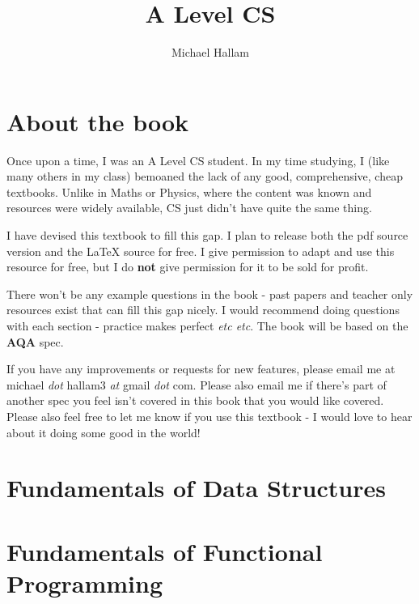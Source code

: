 \documentclass{article}
\title{A Level CS}
\author{Michael Hallam}
\newcommand{\sub}[1]{}
\begin{document}
	\maketitle
	\newpage

	\section{About the book}
	Once upon a time, I was an A Level CS student. In my time studying, I (like many others in my class) bemoaned the lack of any good, comprehensive, cheap textbooks. Unlike in Maths or Physics, where the content was known and resources were widely available, CS just didn't have quite the same thing.

	I have devised this textbook to fill this gap. I plan to release both the pdf source version and the \LaTeX{} source for free. I give permission to adapt and use this resource for free, but I do \textbf{not} give permission for it to be sold for profit.

	There won't be any example questions in the book - past papers and teacher only resources exist that can fill this gap nicely. I would recommend doing questions with each section - practice makes perfect \textit{etc etc}. The book will be based on the \textbf{AQA} spec.
	
	If you have any improvements or requests for new features, please email me at michael \textit{dot} hallam3 \textit{at} gmail \textit{dot} com. Please also email me if there's part of another spec you feel isn't covered in this book that you would like covered. Please also feel free to let me know if you use this textbook - I would love to hear about it doing some good in the world!

	\newpage

	\tableofcontents


	\section{Fundamentals of Data Structures}
	\sub{datastruct}

	\section{Fundamentals of Functional Programming}
	\sub{fp}
\end{document}
